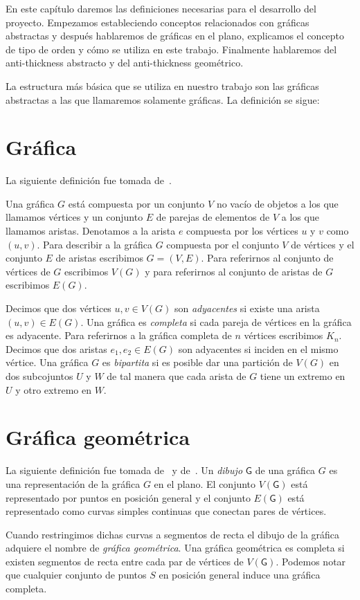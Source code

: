 En este capítulo daremos las definiciones necesarias para el desarrollo del proyecto.
Empezamos estableciendo conceptos relacionados con gráficas abstractas y después
hablaremos de gráficas en el plano, explicamos el concepto de tipo de orden y cómo
se utiliza en este trabajo. Finalmente hablaremos del anti-thickness abstracto
y del anti-thickness geométrico.

La estructura más básica que se utiliza en nuestro trabajo son las gráficas abstractas
a las que llamaremos solamente gráficas. La definición se sigue:
\section{Gráfica}
La siguiente definición fue tomada de~\cite{Chartrand2008}.

Una gráfica $G$ está compuesta por un conjunto $V$ no vacío de objetos a los que llamamos vértices
y un conjunto $E$ de parejas de elementos de $V$ a los que llamamos aristas. Denotamos
a la arista $e$ compuesta por los vértices $u$ y $v$ como $(u,v)$. Para describir a la gráfica $G$
compuesta por el conjunto $V$ de vértices y el conjunto $E$ de aristas escribimos $G=(V,E)$.
Para referirnos al conjunto de vértices de $G$ escribimos $V(G)$ y para referirnos
al conjunto de aristas de $G$ escribimos $E(G)$.

Decimos que dos vértices $u,v\in V(G)$ son \emph{adyacentes} si existe una arista
$(u,v)\in E(G)$. Una gráfica es \emph{completa} si cada pareja de vértices
en la gráfica es adyacente. Para referirnos a la gráfica completa de $n$ vértices
escribimos $K_n$. Decimos que dos aristas $e_1,e_2 \in E(G)$ son adyacentes
si inciden en el mismo vértice. Una gráfica $G$ es \emph{bipartita} si es posible
dar una partición de $V(G)$ en dos subcojuntos $U$ y $W$ de tal manera que cada
arista de $G$ tiene un extremo en $U$ y otro extremo en $W$.
\section{Gráfica geométrica}
La siguiente definición fue tomada de~\cite{Pach2013} y de~\cite{Lara2019}.
Un \emph{dibujo} $\mathsf{G}$ de una gráfica $G$ es una representación de la
gráfica $G$ en el plano. El conjunto $V(\mathsf{G})$ está representado por puntos
en posición general y el conjunto $E(\mathsf{G})$ está representado como curvas
simples continuas que conectan pares de vértices.

Cuando restringimos dichas curvas a segmentos de recta el dibujo de la gráfica
adquiere el nombre de \emph{gráfica geométrica}. Una gráfica
geométrica es completa si existen segmentos de recta entre cada par de vértices
de $V(\mathsf{G})$. Podemos notar que cualquier conjunto de puntos $S$ en posición
general induce una gráfica completa.


